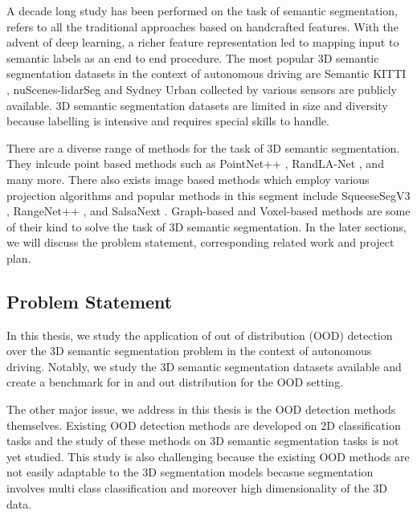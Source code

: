 \documentclass[thesis]{mas_proposal}
\begin{document}
A decade long study has been performed on the task of semantic segmentation, \cite{ZHU201612} refers to all the traditional approaches based on handcrafted features.
With the advent of deep learning, a richer feature representation led to mapping input to semantic labels as an end to end procedure.
The most popular 3D semantic segmentation datasets in the context of autonomous driving are Semantic KITTI \cite{Behley_2019_ICCV}, nuScenes-lidarSeg \cite{caesar2020nuscenes} and Sydney Urban \cite{de2013unsupervised} collected by various sensors are publicly available.
3D semantic segmentation datasets are limited in size and diversity because labelling is intensive and requires special skills to handle.

There are a diverse range of methods for the task of 3D semantic segmentation. 
They inlcude point based methods such as PointNet++ \cite{qi2017pointnet++}, RandLA-Net \cite{Hu_2020_CVPR_Randla}, and many more.
There also exists image based methods which employ various projection algorithms and popular methods in this segment include SqueeseSegV3 \cite{Sequesesegv3_2018}, RangeNet++ \cite{Milioto2019}, and SalsaNext \cite{SalsaNext_2020}.
Graph-based and Voxel-based methods are some of their kind to solve the task of 3D semantic segmentation.
In the later sections, we will discuss the problem statement, corresponding related work and project plan.


\subsection{Problem Statement}
In this thesis, we study the application of out of distribution (OOD) detection over the 3D semantic segmentation problem in the context of autonomous driving.
Notably, we study the 3D semantic segmentation datasets available and create a benchmark for in and out distribution for the OOD setting.

The other major issue, we address in this thesis is the OOD detection methods themselves.
Existing OOD detection methods are developed on 2D classification tasks and the study of these methods on 3D semantic segmentation tasks is not yet studied. 
This study is also challenging because the existing OOD methods are not easily adaptable to the 3D segmentation models becasue segmentation involves multi class classification and moreover high dimensionality of the 3D data.
\newline
\end{document}
